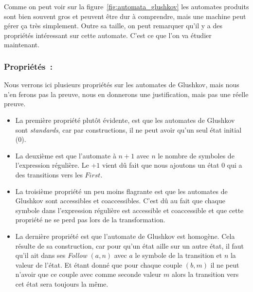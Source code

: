 \vphantom{}

Comme on peut voir sur la figure~\ref{fig:automata_glushkov} les automates
produits sont bien souvent gros et peuvent être dur à comprendre, mais une
machine peut gérer ça très simplement. Outre sa taille, on peut remarquer qu'il
y a des propriétés intéressant sur cette automate. C'est ce que l'on va étudier
maintenant.

\subsubsection*{Propriétés~:}

Nous verrons ici plusieurs propriétés sur les automates de Glushkov, mais nous
n'en ferons pas la preuve, nous en donnerons une justification, mais pas une
réelle preuve.

\vphantom{}

\begin{itemize}[label=\textbullet]
    \item La première propriété plutôt évidente, est que les automates de Glushkov sont
          \textit{standards}, car par constructions, il ne peut avoir qu'un seul état
          initial (0).

          \vphantom{}

    \item La deuxième est que l'automate à \(n + 1\) avec \(n\) le nombre de symboles de
          l'expression régulière. Le \(+ 1\) vient dû fait que nous ajoutons un état
          \(0\) qui a des transitions vers les \(First\).

          \vphantom{}

    \item La troisième propriété un peu moins flagrante est que les automates de Glushkov
          sont accessibles et coaccessibles. C'est dû au fait que chaque symbole dans
          l'expression régulière est accessible et coaccessible et que cette propriété ne
          se perd pas lors de la transformation.

          \vphantom{}

    \item La dernière propriété est que l'automate de Glushkov est homogène. Cela résulte
          de sa construction, car pour qu'un état aille sur un autre état, il faut qu'il
          ait dans ses \textit{Follow} \((a, n)\) avec \(a\) le symbole de la transition
          et \(n\) la valeur de l'état. Et étant donné que pour chaque couple \((b, m)\)
          il ne peut n'avoir que ce couple avec comme seconde valeur \(m\) alors la
          transition vers cet état sera toujours la même.
\end{itemize}

